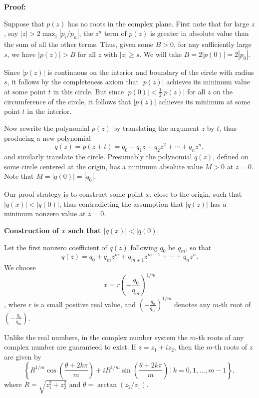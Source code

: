 \textbf{Proof:}

Suppose that \(p(z)\) has no roots in the complex plane. First note that for large \(z\), say \(|z| > 2 \max_i |p_i/p_n|\), the \(z^n\) term of \(p(z)\) is greater in absolute 
value than the sum of all the other terms. Thus, given some \(B > 0\), for any sufficiently large \(s\), we have \(|p(z)| > B\) for all \(z\) with \(|z| \geq s\). We will take \(B = 2|p(0)| = 2|p_0|\).
\vspace{\baselineskip}

Since \(|p(z)|\) is continuous on the interior and boundary of the circle with radius \(s\), it follows by the completeness axiom that \(|p(z)|\) achieves its minimum value at some point \(t\) in this circle. But since \(|p(0)| < \frac{1}{2} |p(z)|\) for all \(z\) on the circumference of the circle, it follows that \(|p(z)|\) achieves its minimum at some point \(t\) in the interior.
\vspace{\baselineskip}

Now rewrite the polynomial \(p(z)\) by translating the argument \(z\) by \(t\), thus producing a new polynomial
\[
	q(z) = p(z + t) = q_0 + q_1 z + q_2 z^2 + \cdots + q_n z^n,
\]
and similarly translate the circle. Presumably the polynomial \(q(z)\), defined on some circle centered at the origin, has a minimum absolute value \(M > 0\) at \(z = 0\). Note that \(M = |q(0)| = |q_0|\).
\vspace{\baselineskip}

Our proof strategy is to construct some point \(x\), close to the origin, such that \(|q(x)| < |q(0)|\), thus contradicting the assumption that \(|q(z)|\) has a minimum nonzero value at \(z = 0\).
\vspace{\baselineskip}

\textbf{Construction of \(x\) such that \(|q(x)| < |q(0)|\)}
\vspace{\baselineskip}

Let the first nonzero coefficient of \(q(z)\) following \(q_0\) be \(q_m\), so that
\[
	q(z) = q_0 + q_m z^m + q_{m+1} z^{m+1} + \cdots + q_n z^n.
\]
We choose
\[
	x = r {\left(-\frac{q_0}{q_m}\right)}^{1/m}
\]
, where \(r\) is a small positive real value, and \({\left(-\frac{q_0}{q_m}\right)}^{1/m}\) denotes any \(m\)-th root of \(\left(-\frac{q_0}{q_m}\right)\).
\vspace{\baselineskip}

Unlike the real numbers, in the complex number system the \(m\)-th roots of any complex number are guaranteed to exist. If \(z = z_1 + i z_2\), then the \(m\)-th roots of \(z\) are given by
\[
	\left\{ R^{1/m} \cos\left(\frac{\theta + 2k\pi}{m}\right) + i R^{1/m} \sin\left(\frac{\theta + 2k\pi}{m}\right) \,\bigg|\, k = 0, 1, \ldots, m-1 \right\},
\]
where \(R = \sqrt{z_1^2 + z_2^2}\) and \(\theta = \arctan(z_2 / z_1)\).
\vspace{\baselineskip}

